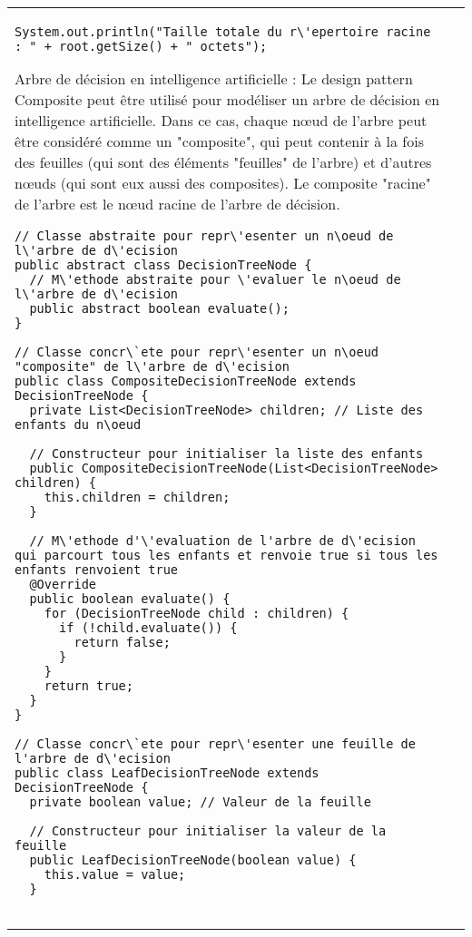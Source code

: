 \begin{table}[H]
\begin{adjustbox}{max width=\textwidth}
\begin{tabular}{l|p{\textwidth}}
\begin{minipage}[tl]{0.5\textwidth}
\begin{minipage}[b]{1\textwidth}
\begin{lstlisting}[style=monstyle]
System.out.println("Taille totale du r\'epertoire racine : " + root.getSize() + " octets");
\end{lstlisting}
\end{minipage}
\end{minipage}
\hspace{6mm}
\begin{minipage}[tr]{0.5\textwidth}
Arbre de décision en intelligence artificielle :
Le design pattern Composite peut être utilisé pour modéliser un arbre de décision en intelligence artificielle. Dans ce cas, chaque nœud de l'arbre peut être considéré comme un "composite", qui peut contenir à la fois des feuilles (qui sont des éléments "feuilles" de l'arbre) et d'autres nœuds (qui sont eux aussi des composites). Le composite "racine" de l'arbre est le nœud racine de l'arbre de décision.
\begin{lstlisting}[style=monstyle]
// Classe abstraite pour repr\'esenter un n\oeud de l\'arbre de d\'ecision
public abstract class DecisionTreeNode {
  // M\'ethode abstraite pour \'evaluer le n\oeud de l\'arbre de d\'ecision
  public abstract boolean evaluate();
}

// Classe concr\`ete pour repr\'esenter un n\oeud "composite" de l\'arbre de d\'ecision
public class CompositeDecisionTreeNode extends DecisionTreeNode {
  private List<DecisionTreeNode> children; // Liste des enfants du n\oeud

  // Constructeur pour initialiser la liste des enfants
  public CompositeDecisionTreeNode(List<DecisionTreeNode> children) {
    this.children = children;
  }

  // M\'ethode d'\'evaluation de l'arbre de d\'ecision qui parcourt tous les enfants et renvoie true si tous les enfants renvoient true
  @Override
  public boolean evaluate() {
    for (DecisionTreeNode child : children) {
      if (!child.evaluate()) {
        return false;
      }
    }
    return true;
  }
}

// Classe concr\`ete pour repr\'esenter une feuille de l'arbre de d\'ecision
public class LeafDecisionTreeNode extends DecisionTreeNode {
  private boolean value; // Valeur de la feuille

  // Constructeur pour initialiser la valeur de la feuille
  public LeafDecisionTreeNode(boolean value) {
    this.value = value;
  }


\end{lstlisting}
\end{minipage}
\end{tabular}
\end{adjustbox}
\end{table}
